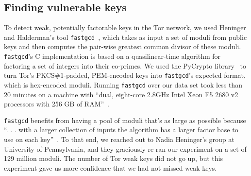 \subsection{Finding vulnerable keys}
\label{sec:vulnerable-keys}
To detect weak, potentially factorable keys in the Tor network, we used Heninger
and Halderman's tool \texttt{fastgcd}~\cite{fastgcd}, which takes as input a set
of moduli from public keys and then computes the pair-wise greatest common
divisor of these moduli.  \texttt{fastgcd}'s C implementation is based on a
quasilinear-time algorithm for factoring a set of integers into their co-primes.
We used the PyCrypto library~\cite{pycrypto} to turn Tor's PKCS\#1-padded,
PEM-encoded keys into \texttt{fastgcd}'s expected format, which is hex-encoded
moduli.  Running \texttt{fastgcd} over our data set took less than 20 minutes on
a machine with ``dual, eight-core 2.8GHz Intel Xeon E5 2680 v2 processors with
256 GB of RAM''~\cite{supercompy}.

\texttt{fastgcd} benefits from having a pool of moduli that's as large as
possible because ``. . . with a larger collection of inputs the algorithm has a
larger factor base to use on each key''~\cite{Heninger2012a}.  To that end, we
reached out to Nadia Heninger's group at University of Pennsylvania, and they
graciously re-ran our experiment on a set of 129 million moduli. The number of
Tor weak keys did not go up, but this experiment gave us more confidence that we
had not missed weak keys.
